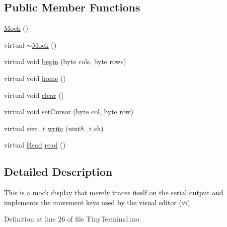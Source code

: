 \subsection*{Public Member Functions}
\begin{DoxyCompactItemize}
\item 
\hypertarget{classMock_a2b9528f2e7fcf9738201a5ea667c1998}{
\hyperlink{classMock_a2b9528f2e7fcf9738201a5ea667c1998}{Mock} ()}
\label{classMock_a2b9528f2e7fcf9738201a5ea667c1998}

\item 
\hypertarget{classMock_a7b663eff1fa3728433fa84a311833935}{
virtual \hyperlink{classMock_a7b663eff1fa3728433fa84a311833935}{$\sim$Mock} ()}
\label{classMock_a7b663eff1fa3728433fa84a311833935}

\item 
virtual void \hyperlink{classMock_abe7c9964a0b81f8bef519f744b700ea5}{begin} (byte cols, byte rows)
\item 
\hypertarget{classMock_a14f55167d439e1cc71af8a601ce31fa8}{
virtual void \hyperlink{classMock_a14f55167d439e1cc71af8a601ce31fa8}{home} ()}
\label{classMock_a14f55167d439e1cc71af8a601ce31fa8}

\item 
\hypertarget{classMock_a1a7bbca9d17ac5f14e0fc48dd1faab3f}{
virtual void \hyperlink{classMock_a1a7bbca9d17ac5f14e0fc48dd1faab3f}{clear} ()}
\label{classMock_a1a7bbca9d17ac5f14e0fc48dd1faab3f}

\item 
virtual void \hyperlink{classMock_a5545e824f824b147221b61355cabbd5b}{setCursor} (byte col, byte row)
\item 
virtual size\_\-t \hyperlink{classMock_ac3d7b857783204d996cd3e0a147a4ac5}{write} (uint8\_\-t ch)
\item 
virtual \hyperlink{structcom_1_1diag_1_1amigo_1_1Display_a57e9915682f8aeb77066171c97c58288}{Read} \hyperlink{classMock_a0fb6d589bee9e919766e1bb17076351c}{read} ()
\end{DoxyCompactItemize}


\subsection{Detailed Description}
This is a mock display that merely traces itself on the serial output and implements the movement keys used by the visual editor (vi). 

Definition at line 26 of file TinyTerminal.ino.



